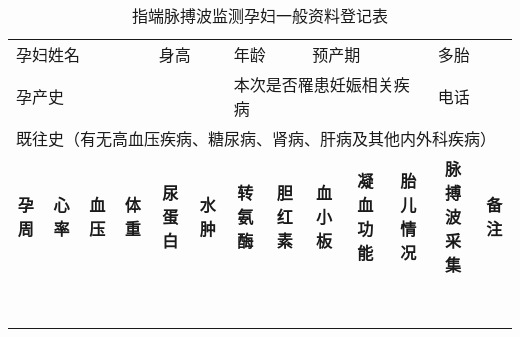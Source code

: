 \begin{table}[htbp]
      \centering
      \fontsize{8}{4}
      \caption{指端脉搏波监测孕妇一般资料登记表}
      \label{tab:questionnaire}%
      \begin{tabularx}{\linewidth}{ccccccccccccc}
      \multicolumn{4}{l}{孕妇姓名} & \multicolumn{2}{l}{身高} & \multicolumn{2}{l}{年龄} & \multicolumn{3}{l}{预产期} & \multicolumn{2}{l}{多胎}\\
      \multicolumn{6}{l}{孕产史}   & \multicolumn{5}{l}{本次是否罹患妊娠相关疾病}  & \multicolumn{2}{l}{电话}  \\
      \multicolumn{13}{l}{既往史（有无高血压疾病、糖尿病、肾病、肝病及其他内外科疾病）}  \\
      \Xhline{1.2pt}
      \textbf{孕周} & \textbf{心率} & \textbf{血压} & \textbf{体重} & \textbf{尿蛋白} & \textbf{水肿} & \textbf{转氨酶} & \textbf{胆红素} & 
      \textbf{血小板} & \textbf{凝血功能} & \textbf{胎儿情况} & \textbf{脉搏波采集} & \textbf{备注} \\
      \hline

      &       &       &       &       &       &       &       &       &       &       &       &  \\

      &       &       &       &       &       &       &       &       &       &       &       &  \\
      
      &       &       &       &       &       &       &       &       &       &       &       &  \\

      &       &       &       &       &       &       &       &       &       &       &       &  \\

      &       &       &       &       &       &       &       &       &       &       &       &  \\

      &       &       &       &       &       &       &       &       &       &       &       &  \\

      &       &       &       &       &       &       &       &       &       &       &       &  \\
      \Xhline{1.2pt}
      \end{tabularx}%
\end{table}%
